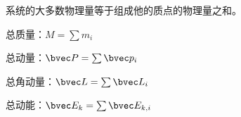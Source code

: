 
系统的大多数物理量等于组成他的质点的物理量之和。

总质量：$M=\sum m_i$

总动量：$\bvec P = \sum \bvec p_i$

总角动量：$\bvec L = \sum \bvec L_i$

总动能：$\bvec E_k = \sum \bvec E_{k,i}$
